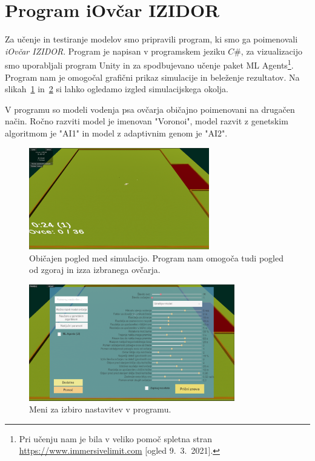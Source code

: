 \section{Program iOvčar IZIDOR}

Za učenje in testiranje modelov smo pripravili program, ki smo ga poimenovali \textit{iOvčar IZIDOR}. Program je napisan v programskem jeziku $C\#$, za vizualizacijo smo uporabljali program Unity in za spodbujevano učenje paket ML Agents\footnote{Pri učenju nam je bila v veliko pomoč spletna stran \url{https://www.immersivelimit.com} [ogled 9.\ 3.\ 2021].}. Program nam je omogočal grafični prikaz simulacije in beleženje rezultatov. Na slikah~\ref{fig:pasnik} in~\ref{fig:meni} si lahko ogledamo izgled simulacijskega okolja.

V programu so modeli vodenja psa ovčarja običajno poimenovani na drugačen način. Ročno razviti model je imenovan "Voronoi", model razvit z genetskim algoritmom je "AI1" in model z adaptivnim genom je "AI2".

\begin{figure}[ht]  %
	\centering
	\includegraphics[width=0.7\textwidth]{../poglavja/images/obicajen-pogled.png}
	\caption[Pogledi med simulacijo]{Običajen pogled med simulacijo. Program nam omogoča tudi pogled od zgoraj in izza izbranega ovčarja.} %
	\label{fig:pasnik}
\end{figure}

\begin{figure}[ht]  %
	\centering
	\includegraphics[width=0.8\textwidth]{../poglavja/images/meni.png}
	\caption[Meni programa]{Meni za izbiro nastavitev v programu.} %
	\label{fig:meni}
\end{figure}
